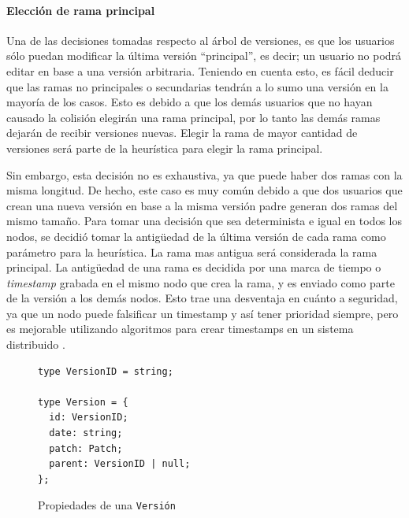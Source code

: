 \paragraph{Elección de rama principal}

Una de las decisiones tomadas respecto al árbol de versiones, es que los usuarios sólo puedan modificar la última versión “principal”, es decir; un usuario no podrá editar en base a una versión arbitraria. Teniendo en cuenta esto, es fácil deducir que las ramas no principales o secundarias tendrán a lo sumo una versión en la mayoría de los casos. Esto es debido a que los demás usuarios que no hayan causado la colisión elegirán una rama principal, por lo tanto las demás ramas dejarán de recibir versiones nuevas. Elegir la rama de mayor cantidad de versiones será parte de la heurística para elegir la rama principal.

Sin embargo, esta decisión no es exhaustiva, ya que puede haber dos ramas con la misma longitud. De hecho, este caso es muy común debido a que dos usuarios que crean una nueva versión en base a la misma versión padre generan dos ramas del mismo tamaño. Para tomar una decisión que sea determinista e igual en todos los nodos, se decidió tomar la antigüedad de la última versión de cada rama como parámetro para la heurística. La rama mas antigua será considerada la rama principal. La antigüedad de una rama es decidida por una marca de tiempo o \textit{timestamp} grabada en el mismo nodo que crea la rama, y es enviado como parte de la versión a los demás nodos. Esto trae una desventaja en cuánto a seguridad, ya que un nodo puede falsificar un timestamp y así tener prioridad siempre, pero es mejorable utilizando algoritmos para crear timestamps en un sistema distribuido \cite{distributed-timestamps}.

\begin{figure}[H]
    \centering
    \begin{minipage}{0.9\linewidth}
        \lstset{
            basicstyle=\ttfamily\small,
            frame=single,
            captionpos=b
        }
        \begin{lstlisting}
type VersionID = string;

type Version = {
  id: VersionID;
  date: string;
  patch: Patch;
  parent: VersionID | null;
};\end{lstlisting}
    \end{minipage}
    \caption{Propiedades de una \texttt{Versión}}
    \label{fig:version-type}
\end{figure}

